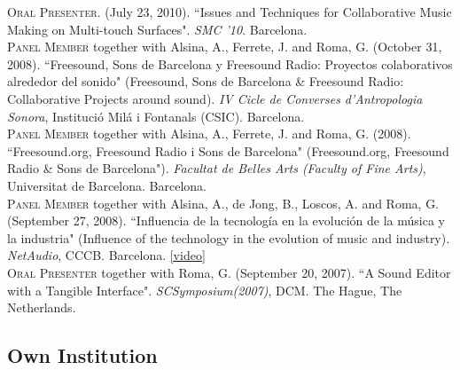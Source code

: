 \documentclass[10pt, a4paper]{article}
\newcommand{\years}[1]{\marginnote{\scriptsize #1}}
\begin{document}
\years{2010} \textsc{Oral Presenter}. (July 23, 2010). “Issues and Techniques for Collaborative Music Making on Multi-touch Surfaces". \emph{SMC '10}. Barcelona.\\
\years{2008c} \textsc{Panel Member} together with Alsina, A., Ferrete, J. and Roma, G. (October 31, 2008). “Freesound, Sons de Barcelona y Freesound Radio: Proyectos colaborativos alrededor del sonido" (Freesound, Sons de Barcelona \& Freesound Radio: Collaborative Projects around sound). \emph{IV Cicle de Converses d'Antropologia Sonora}, Institució Milá i Fontanals (CSIC). Barcelona.\\
\years{2008b} \textsc{Panel Member} together with Alsina, A., Ferrete, J. and Roma, G. (2008). “Freesound.org, Freesound Radio i Sons de Barcelona" (Freesound.org, Freesound Radio \& Sons de Barcelona"). \emph{Facultat de Belles Arts (Faculty of Fine Arts)}, Universitat de Barcelona. Barcelona.\\
\years{2008a} \textsc{Panel Member} together with Alsina, A., de Jong, B., Loscos, A. and Roma, G. (September 27, 2008). “Influencia de la tecnología en la evolución de la música y la industria" (Influence of the technology in the evolution of music and industry). \emph{NetAudio}, CCCB. Barcelona. \href{https://www.youtube.com/watch?v=6JlCCvYXrHY}{[video]}\\
\years{2007}\textsc{Oral Presenter} together with Roma, G. (September 20, 2007). “A Sound Editor with a Tangible Interface". \emph{SCSymposium(2007)}, DCM. The Hague, The Netherlands.\\

\subsection*{Own Institution}
\noindent
\end{document}
